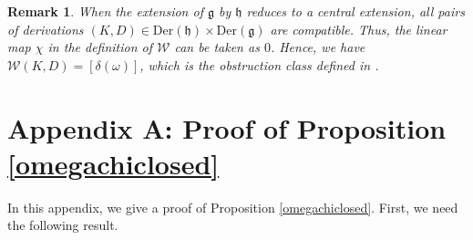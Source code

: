 \documentclass[12pt]{amsart}
\newtheorem{rmk}[thm]{Remark}
\newcommand{\g}{\mathfrak g}
\newcommand{\h}{\mathfrak h}
\newcommand{\huaW}{\mathcal{W}}
\newcommand{\Der}{\mathrm{Der}}
\begin{document}
\begin{rmk}
When the extension of $\g$ by $\h$ reduces to a central extension, all pairs of derivations $(K,D)\in\Der(\h)\times\Der(\g)$ are compatible. Thus, the linear map $\chi$ in the definition of $\huaW$ can be taken as $0$. Hence, we have $\huaW(K,D)=[\delta(\omega)]$, which is the obstruction class defined in \cite{TFS}.
\end{rmk}

   













\section*{Appendix A: Proof of Proposition \ref{omegachiclosed}}
In this appendix, we give a proof of Proposition \ref{omegachiclosed}. First, we need the following result.
\end{document}
